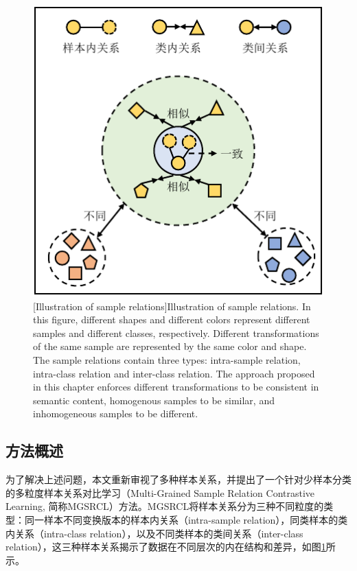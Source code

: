 \begin{figure}[h!]
\centering
{}
\includegraphics[width=0.6\columnwidth]{figures/MGSRCL/SampleRelation.pdf}
[Illustration of sample relations]{Illustration of sample relations. In this figure, different shapes and different colors represent different samples and different classes, respectively. Different transformations of the same sample are represented by the same color and shape. The sample relations contain three types: intra-sample relation, intra-class relation and inter-class relation. The approach proposed in this chapter enforces different transformations to be consistent in semantic content, homogenous samples to be similar, and inhomogeneous samples to be different.}
\label{figure3: sample relation}
\end{figure}

\subsection[\hspace{-2pt}方法概述]{{\heiti{} \hspace{-8pt}方法概述}}\label{section3: 方法概述}

为了解决上述问题，本文重新审视了多种样本关系，并提出了一个针对少样本分类的多粒度样本关系对比学习（Multi-Grained Sample Relation Contrastive Learning, 简称MGSRCL）方法。MGSRCL将样本关系分为三种不同粒度的类型：同一样本不同变换版本的样本内关系（intra-sample relation），同类样本的类内关系（intra-class relation），以及不同类样本的类间关系（inter-class relation），这三种样本关系揭示了数据在不同层次的内在结构和差异，如图\ref{figure3: sample relation}所示。

